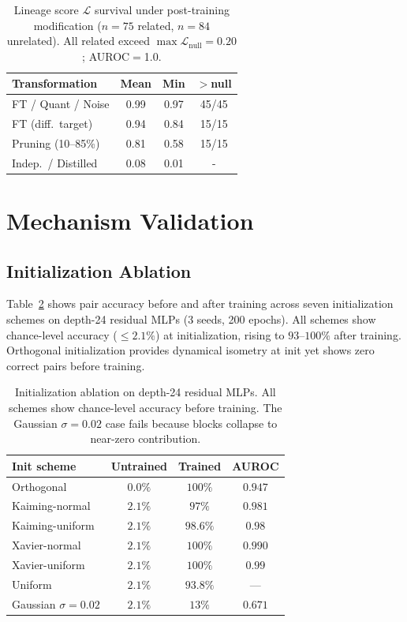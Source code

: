 \begin{table}[h]
\centering
\small
\setlength{\tabcolsep}{3pt}
\begin{tabular}{@{}lccc@{}}
\toprule
Transformation & Mean & Min & $>$null \\
\midrule
FT / Quant / Noise & 0.99 & 0.97 & 45/45 \\
FT (diff.\ target) & 0.94 & 0.84 & 15/15 \\
Pruning (10--85\%) & 0.81 & 0.58 & 15/15 \\
\midrule
Indep.\ / Distilled & 0.08 & 0.01 & - \\
\bottomrule
\end{tabular}
\caption{Lineage score $\mathcal{L}$ survival under post-training modification ($n{=}75$ related, $n{=}84$ unrelated). All related exceed $\max \mathcal{L}_{\text{null}} = 0.20$; AUROC$=$1.0.}
\label{tab:survival}
\end{table}

\section{Mechanism Validation}\label{app:mechanism}

\subsection{Initialization Ablation}\label{app:init-ablation}

Table~\ref{tab:init-ablation} shows pair accuracy before and after training across seven initialization schemes on depth-24 residual MLPs (3 seeds, 200 epochs). All schemes show chance-level accuracy (${\leq}2.1\%$) at initialization, rising to $93$--$100\%$ after training. Orthogonal initialization provides dynamical isometry at init yet shows zero correct pairs before training.

\begin{table}[h]
\centering
\small
\begin{tabular}{@{}lccc@{}}
\toprule
Init scheme & Untrained & Trained & AUROC \\
\midrule
Orthogonal       & $0.0\%$  & $100\%$ & $0.947$ \\
Kaiming-normal   & $2.1\%$  & $97\%$  & $0.981$ \\
Kaiming-uniform  & $2.1\%$  & $98.6\%$ & $0.98$ \\
Xavier-normal    & $2.1\%$  & $100\%$ & $0.990$ \\
Xavier-uniform   & $2.1\%$  & $100\%$ & $0.99$ \\
Uniform          & $2.1\%$  & $93.8\%$ & --- \\
Gaussian $\sigma{=}0.02$ & $2.1\%$ & $13\%$ & $0.671$ \\
\bottomrule
\end{tabular}
\caption{Initialization ablation on depth-24 residual MLPs. All schemes show chance-level accuracy before training. The Gaussian $\sigma{=}0.02$ case fails because blocks collapse to near-zero contribution.}
\label{tab:init-ablation}
\end{table}

